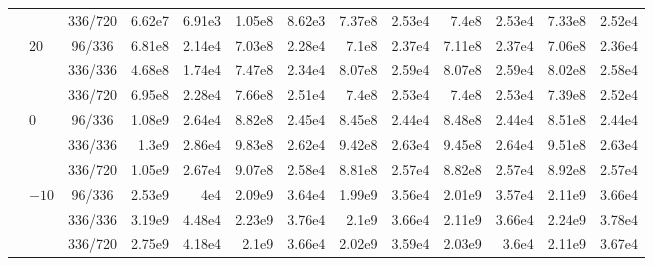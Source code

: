 \documentclass[12pt]{article}
\theoremstyle{definition}
\begin{document}
{\begin{enumerate}[label=\textbf{1.2.\arabic*}, leftmargin=*]
{\begin{longtable}{@{}llc@{\hspace{6pt}}rr@{\hspace{8pt}}rr@{\hspace{8pt}}rr@{\hspace{8pt}}rr@{\hspace{8pt}}rr@{}}
 &  & 336/720 & 6.62e7 & 6.91e3 & 1.05e8 & 8.62e3 & 7.37e8 & 2.53e4 & 7.4e8 & 2.53e4 & 7.33e8 & 2.52e4 \\
\addlinespace[2pt]
 & 20 & 96/336 & 6.81e8 & 2.14e4 & 7.03e8 & 2.28e4 & 7.1e8 & 2.37e4 & 7.11e8 & 2.37e4 & 7.06e8 & 2.36e4 \\
 &  & 336/336 & 4.68e8 & 1.74e4 & 7.47e8 & 2.34e4 & 8.07e8 & 2.59e4 & 8.07e8 & 2.59e4 & 8.02e8 & 2.58e4 \\
 &  & 336/720 & 6.95e8 & 2.28e4 & 7.66e8 & 2.51e4 & 7.4e8 & 2.53e4 & 7.4e8 & 2.53e4 & 7.39e8 & 2.52e4 \\
\addlinespace[2pt]
 & 0 & 96/336 & 1.08e9 & 2.64e4 & 8.82e8 & 2.45e4 & 8.45e8 & 2.44e4 & 8.48e8 & 2.44e4 & 8.51e8 & 2.44e4 \\
 &  & 336/336 & 1.3e9 & 2.86e4 & 9.83e8 & 2.62e4 & 9.42e8 & 2.63e4 & 9.45e8 & 2.64e4 & 9.51e8 & 2.63e4 \\
 &  & 336/720 & 1.05e9 & 2.67e4 & 9.07e8 & 2.58e4 & 8.81e8 & 2.57e4 & 8.82e8 & 2.57e4 & 8.92e8 & 2.57e4 \\
\addlinespace[2pt]
 & $-10$ & 96/336 & 2.53e9 & 4e4 & 2.09e9 & 3.64e4 & 1.99e9 & 3.56e4 & 2.01e9 & 3.57e4 & 2.11e9 & 3.66e4 \\
 &  & 336/336 & 3.19e9 & 4.48e4 & 2.23e9 & 3.76e4 & 2.1e9 & 3.66e4 & 2.11e9 & 3.66e4 & 2.24e9 & 3.78e4 \\
 &  & 336/720 & 2.75e9 & 4.18e4 & 2.1e9 & 3.66e4 & 2.02e9 & 3.59e4 & 2.03e9 & 3.6e4 & 2.11e9 & 3.67e4 \\
\end{longtable}

}
\end{enumerate}}
\end{document}
